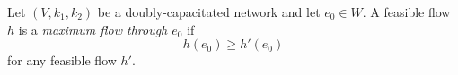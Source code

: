 Let $(V, k_1, k_2)$ be a doubly-capacitated network and let $e_0 \in W$. A feasible flow $h$ is a \textit{maximum flow through $e_0$} if
$$h(e_0) \geq h'(e_0)$$
for any feasible flow $h'$.
